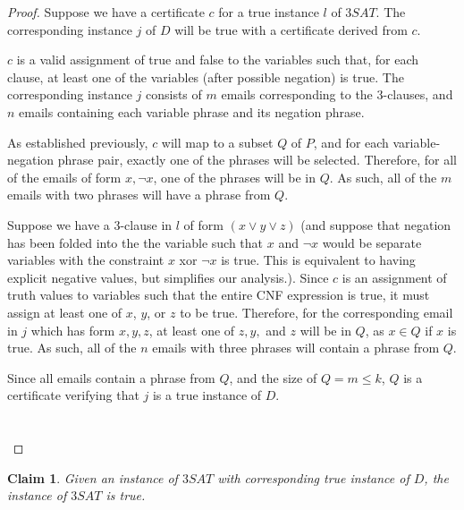 \documentclass[11pt]{article}
\newtheorem{claim}{Claim}
\begin{document}
\begin{proof}
    Suppose we have a certificate $c$ for a true instance $l$ of $3SAT$. The corresponding instance $j$ of $D$ will be true with a certificate derived from $c$. 

    $c$ is a valid assignment of true and false to the variables such that, for each clause, at least one of the variables (after possible negation) is true. The corresponding instance $j$ consists of $m$ emails corresponding to the 3-clauses, and $n$ emails containing each variable phrase and its negation phrase. 

    As established previously, $c$ will map to a subset $Q$ of $P$, and for each variable-negation phrase pair, exactly one of the phrases will be selected. Therefore, for all of the emails of form $x, \lnot x$, one of the phrases will be in $Q$. As such, all of the $m$ emails with two phrases will have a phrase from $Q$.

    Suppose we have a 3-clause in $l$ of form $(x \lor y \lor z)$ (and suppose that negation has been folded into the the variable such that $x$ and $\lnot x$ would be separate variables with the constraint $x $ xor $ \lnot x$ is true. This is equivalent to having explicit negative values, but simplifies our analysis.). Since $c$ is an assignment of truth values to variables such that the entire CNF expression is true, it must assign at least one of $x$, $y$, or $z$ to be true. Therefore, for the corresponding email in $j$ which has form $x, y, z$, at least one of $z, y,$ and $z$ will be in $Q$, as $x \in Q$ if $x$ is true. As such, all of the $n$ emails with three phrases will contain a phrase from $Q$. 

    Since all emails contain a phrase from $Q$, and the size of $Q = m \leq k$, $Q$ is a certificate verifying that $j$ is a true instance of $D$. \\ \\ \\ 
\end{proof}

\begin{claim}
   Given an instance of $3SAT$ with corresponding true instance of $D$, the instance of $3SAT$ is true. 
\end{claim}
\end{document}

